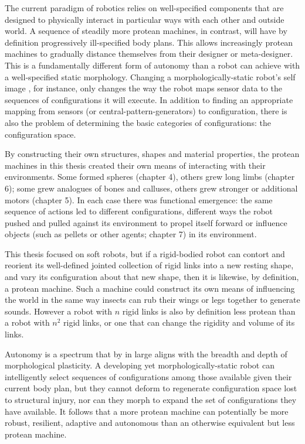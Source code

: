 The current paradigm of robotics relies on well-specified components that are designed to physically interact in particular ways with each other and outside world.
A sequence of steadily more protean machines, in contrast, will have by definition progressively ill-specified body plans.
This allows increasingly protean machines to gradually distance themselves from their designer or meta-designer.
This is a fundamentally different form of autonomy than a robot can achieve with a well-specified static morphology.
Changing a morphologically-static robot's self image \cite{bongard2006resilient,cully2015robots}, for instance, 
only changes the way the robot maps sensor data to 
the sequences of configurations it will execute.
In addition to finding an appropriate mapping from sensors (or central-pattern-generators) to configuration, 
there is also the problem of determining the basic categories of configurations: the configuration space.

By constructing their own structures, shapes and material properties, 
the protean machines in this thesis created their own means of interacting with their environments.
Some formed spheres (chapter 4), others grew long limbs (chapter 6); 
some grew analogues of bones and calluses, others grew stronger or additional motors (chapter 5).
In each case there was functional emergence: 
the same sequence of actions led to different configurations, different ways the robot pushed and pulled against its environment to propel itself forward or influence objects (such as pellets or other agents; chapter 7) in its environment.

This thesis focused on soft robots,
but if a rigid-bodied robot can contort and reorient its well-defined jointed collection of rigid links into a new resting shape, and vary its configuration about that new shape, then it is likewise, by definition, a protean machine.
Such a machine could construct its own means of influencing the world in the same way insects can rub their wings or legs together
to generate sounds.
However a robot with $n$ rigid links is also by definition less protean than a robot with $n^2$ rigid links, or one that can change the rigidity and volume of its links.

Autonomy is a spectrum that by in large aligns with the breadth and depth of morphological plasticity.
A developing yet morphologically-static robot \cite{husbands1998better,floreano1996plastic,bongard2011morphological,bongard2006resilient,cully2015robots} can intelligently select sequences of configurations among those available given their current body plan,
but they cannot deform to regenerate configuration space lost to structural injury, nor can they morph to expand the set of configurations they have available.
It follows that a more protean machine can potentially be more robust, resilient, adaptive and autonomous than an otherwise equivalent but less protean machine.


